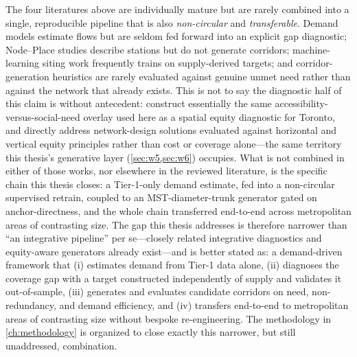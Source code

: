 The four literatures above are individually mature but are rarely combined into a single,
reproducible pipeline that is also \emph{non-circular} and \emph{transferable}. Demand
models estimate flows but are seldom fed forward into an explicit gap diagnostic; Node--Place
studies describe stations but do not generate corridors; machine-learning siting work
frequently trains on supply-derived targets; and corridor-generation heuristics are rarely
evaluated against genuine unmet need rather than against the network that already exists.
This is not to say the diagnostic half of this claim is without antecedent:
\textcite{foth2013equitable} construct essentially the same accessibility-versus-social-need
overlay used here as a spatial equity diagnostic for Toronto, and \textcite{camporeale2019equity}
directly address network-design solutions evaluated against horizontal and vertical equity
principles rather than cost or coverage alone---the same territory this thesis's generative
layer (\cref{sec:w5,sec:w6}) occupies. What is not combined in either of those works, nor
elsewhere in the reviewed literature, is the specific chain this thesis closes: a Tier-1-only
demand estimate, fed into a non-circular supervised retrain, coupled to an MST-diameter-trunk
generator gated on anchor-directness, and the whole chain transferred end-to-end across
metropolitan areas of contrasting size. The gap this thesis addresses is therefore narrower
than ``an integrative pipeline'' per se---closely related integrative diagnostics and
equity-aware generators already exist---and is better stated as: a demand-driven framework
that (i) estimates demand from Tier-1 data alone, (ii) diagnoses the coverage gap with a
target constructed independently of supply and validates it out-of-sample, (iii) generates
and evaluates candidate corridors on need, non-redundancy, and demand efficiency, and (iv)
transfers end-to-end to metropolitan areas of contrasting size without bespoke
re-engineering. The methodology in \cref{ch:methodology} is organized to close exactly this
narrower, but still unaddressed, combination.
